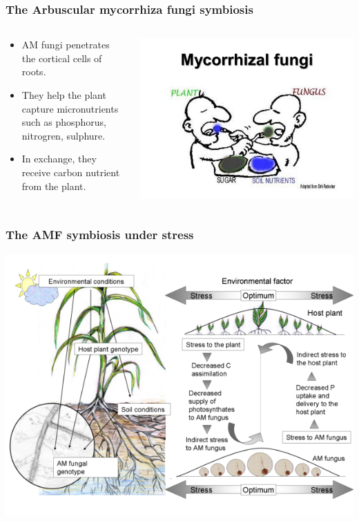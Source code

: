 \documentclass[xcolor=dvipsnames]{beamer}
\begin{document}
\begin{frame}
\frametitle{The Arbuscular mycorrhiza fungi symbiosis}
\begin{columns}
\begin{column}{0.5\linewidth}
\begin{itemize}[label={$\bullet$}]
\item AM fungi penetrates the cortical cells of roots.
\item They help the plant
capture micronutrients such as phosphorus, nitrogren, sulphure.
\item In exchange, they receive carbon nutrient from the plant.
\end{itemize}
\end{column}
\begin{column}{0.5\linewidth}
\includegraphics[width=\linewidth]{images/amf_symbiosis.jpg}
\end{column}
\end{columns}
\end{frame}

\begin{frame}
\frametitle{The AMF symbiosis under stress}
\begin{center}
\includegraphics[width=0.8\linewidth]{images/amf_stress.png}
\end{center}
\end{frame}
\end{document}
